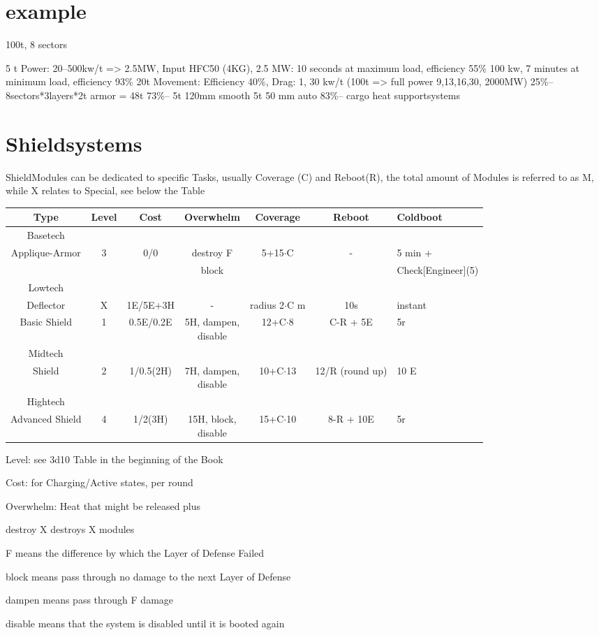 \section{example}\label{sec:example}
100t, 8 sectors

5 t Power: 20--500kw/t => 2.5MW, Input HFC50 (4KG),
2.5 MW: 10 seconds at maximum load, efficiency 55\%
100 kw, 7 minutes at minimum load, efficiency 93\%
20t Movement: Efficiency 40\%, Drag: 1, 30 kw/t
(100t => full power 9,13,16,30, 2000MW)
25\%--
8sectors*3layers*2t armor = 48t
73\%--
5t 120mm smooth
5t 50 mm auto
83\%--
cargo
heat
supportsystems



\section{Shieldsystems}\label{sec:shieldsystems}
ShieldModules can be dedicated to specific Tasks, usually
Coverage (C) and Reboot(R), the total amount of Modules is referred to as M, while
X relates to Special, see below the Table\par
\begin{tabular}{c|cccccl}
    Type & Level & Cost & Overwhelm & Coverage & Reboot & Coldboot \\
    \hline Basetech\\
    Applique-Armor & 3 & 0/0 & destroy F& 5+15\(\cdot\)C & -  & 5 min + \\
    &&&block&&& Check[Engineer](5) \\
    \hline Lowtech\\
    Deflector & X & 1E/5E+3H & - & radius 2\(\cdot\)C m & 10s & instant \\
    Basic Shield & 1 & 0.5E/0.2E & \makecell{5H, dampen, \\ disable}&12+C\(\cdot\)8 & C-R + 5E & 5r \\
    \hline Midtech\\
    Shield & 2 & 1/0.5(2H) & \makecell{7H, dampen,\\ disable} & 10+C\(\cdot\)13 & 12/R (round up) & 10 E \\
    \hline Hightech\\
    Advanced Shield & 4 & 1/2(3H) & \makecell{15H, block,\\ disable}& 15+C\(\cdot\)10 & 8-R + 10E & 5r \\
\end{tabular}\par
Level: see 3d10 Table in the beginning of the Book\par
Cost: for Charging/Active states, per round\par
Overwhelm: Heat that might be released plus \par
\tab destroy X destroys X modules\par
\tab F means the difference by which the Layer of Defense Failed\par
\tab block means pass through no damage to the next Layer of Defense\par
\tab dampen means pass through F damage\par
\tab disable means that the system is disabled until it is booted again\par

